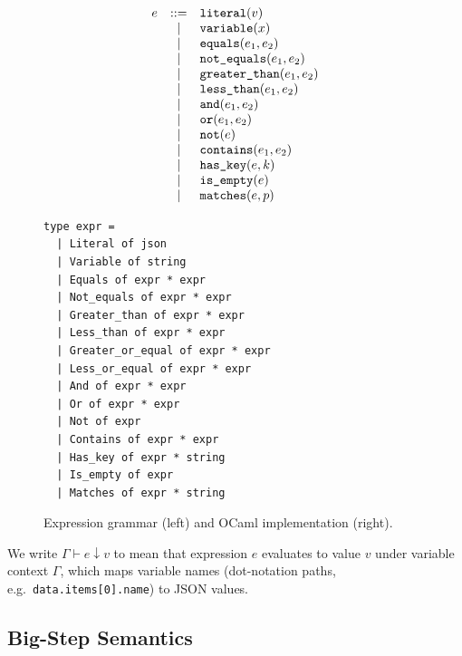 \begin{figure}[t]
\begin{minipage}{0.48\textwidth}
\small
\[
\begin{array}{rcl}
e &::=& \identifiable{literal}(v) \\
  &\mid& \identifiable{variable}(x) \\
  &\mid& \identifiable{equals}(e_1, e_2) \\
  &\mid& \identifiable{not\_equals}(e_1, e_2) \\
  &\mid& \identifiable{greater\_than}(e_1, e_2) \\
  &\mid& \identifiable{less\_than}(e_1, e_2) \\
  &\mid& \identifiable{and}(e_1, e_2) \\
  &\mid& \identifiable{or}(e_1, e_2) \\
  &\mid& \identifiable{not}(e) \\
  &\mid& \identifiable{contains}(e_1, e_2) \\
  &\mid& \identifiable{has\_key}(e, k) \\
  &\mid& \identifiable{is\_empty}(e) \\
  &\mid& \identifiable{matches}(e, p)
\end{array}
\]
\end{minipage}
\hfill
\begin{minipage}{0.48\textwidth}
\small
\begin{lstlisting}[style=ocaml]
type expr =
  | Literal of json
  | Variable of string
  | Equals of expr * expr
  | Not_equals of expr * expr
  | Greater_than of expr * expr
  | Less_than of expr * expr
  | Greater_or_equal of expr * expr
  | Less_or_equal of expr * expr
  | And of expr * expr
  | Or of expr * expr
  | Not of expr
  | Contains of expr * expr
  | Has_key of expr * string
  | Is_empty of expr
  | Matches of expr * string
\end{lstlisting}
\end{minipage}
\caption{Expression grammar (left) and OCaml implementation (right).}
\label{fig:expr-grammar}
\end{figure}

We write $\Gamma \vdash e \downarrow v$ to mean that expression $e$ evaluates to
value $v$ under variable context $\Gamma$, which maps variable names (dot-notation
paths, e.g.\ \texttt{data.items[0].name}) to JSON values.

\subsection{Big-Step Semantics}\label{sec:expr-semantics}

